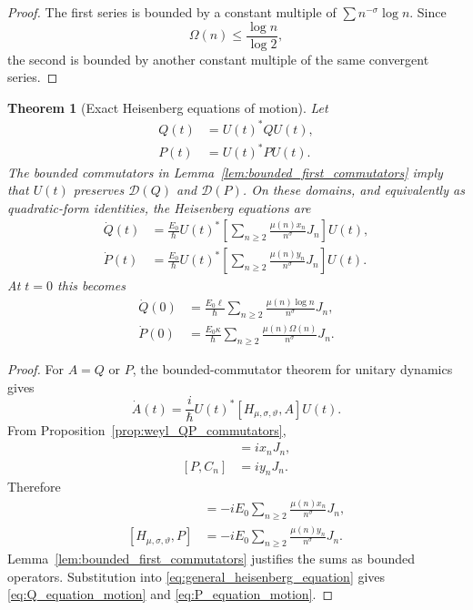 \documentclass[11pt]{amsart}
\numberwithin{equation}{section}
\theoremstyle{plain}
\newtheorem{theorem}{Theorem}[section]
\theoremstyle{definition}
\theoremstyle{remark}
\newcommand{\Dom}{\mathcal{D}}
\newcommand{\Om}{\Omega}
\begin{document}
\begin{proof}
The first series is bounded by a constant multiple of
$\sum n^{-\sigma}\log n$.  Since
\begin{equation}
\Om(n)\le\frac{\log n}{\log2},
\label{eq:Omega_log_bound}
\end{equation}
the second is bounded by another constant multiple of the same convergent
series.
\end{proof}

\begin{theorem}[Exact Heisenberg equations of motion]
\label{thm:equations_of_motion}
Let
\begin{align}
Q(t)
&=U(t)^*QU(t),
\label{eq:Qt_definition}\\
P(t)
&=U(t)^*PU(t).
\label{eq:Pt_definition}
\end{align}
The bounded commutators in Lemma~\ref{lem:bounded_first_commutators} imply that $U(t)$ preserves $\Dom(Q)$ and $\Dom(P)$.  On these domains, and equivalently as quadratic-form identities, the Heisenberg equations are
\begin{align}
\dot Q(t)
&=
\frac{E_0}{\hbar}
U(t)^*
\left[
\sum_{n\ge2}
\frac{\mu(n)x_n}{n^{\sigma}}J_n
\right]
U(t),
\label{eq:Q_equation_motion}\\
\dot P(t)
&=
\frac{E_0}{\hbar}
U(t)^*
\left[
\sum_{n\ge2}
\frac{\mu(n)y_n}{n^{\sigma}}J_n
\right]
U(t).
\label{eq:P_equation_motion}
\end{align}
At $t=0$ this becomes
\begin{align}
\dot Q(0)
&=
\frac{E_0\ell}{\hbar}
\sum_{n\ge2}
\frac{\mu(n)\log n}{n^{\sigma}}J_n,
\label{eq:Qdot_zero}\\
\dot P(0)
&=
\frac{E_0\kappa}{\hbar}
\sum_{n\ge2}
\frac{\mu(n)\Om(n)}{n^{\sigma}}J_n.
\label{eq:Pdot_zero}
\end{align}
\end{theorem}

\begin{proof}
For $A=Q$ or $P$, the bounded-commutator theorem for unitary dynamics gives
\begin{equation}
\dot A(t)
=
\frac{i}{\hbar}U(t)^*[H_{\mu,\sigma,\vartheta},A]U(t).
\label{eq:general_heisenberg_equation}
\end{equation}
From Proposition~\ref{prop:weyl_QP_commutators},
\begin{align}
[Q,C_n]
&=ix_nJ_n,
\label{eq:Q_Cn_commutator}\\
[P,C_n]
&=iy_nJ_n.
\label{eq:P_Cn_commutator}
\end{align}
Therefore
\begin{align}
[H_{\mu,\sigma,\vartheta},Q]
&=
-iE_0\sum_{n\ge2}
\frac{\mu(n)x_n}{n^{\sigma}}J_n,
\label{eq:H_Q_commutator}\\
[H_{\mu,\sigma,\vartheta},P]
&=
-iE_0\sum_{n\ge2}
\frac{\mu(n)y_n}{n^{\sigma}}J_n.
\label{eq:H_P_commutator}
\end{align}
Lemma~\ref{lem:bounded_first_commutators} justifies the sums as bounded
operators.  Substitution into \eqref{eq:general_heisenberg_equation} gives
\eqref{eq:Q_equation_motion} and \eqref{eq:P_equation_motion}.
\end{proof}
\end{document}
